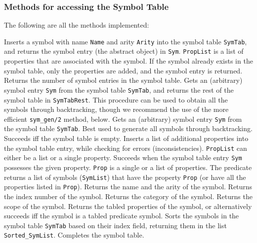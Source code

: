 \subsubsection{Methods for accessing the Symbol Table}
The following are all the methods implemented:

\begin{description}
	Inserts a symbol with name {\tt Name} and arity {\tt Arity} into 
	the symbol table {\tt SymTab}, and returns the symbol entry (the
	abstract object) in {\tt Sym}.  {\tt PropList} is a list of
	properties that are associated with the symbol.  If the symbol
	already exists in the symbol table, only the properties are
	added, and the symbol entry is returned.
	Returns the number of symbol entries in the symbol table.
	Gets an (arbitrary) symbol entry {\tt Sym} from the symbol table 
	{\tt SymTab}, and returns the rest of the symbol table in 
	{\tt SymTabRest}.  This procedure can be used to obtain
	all the symbols through backtracking, though we recommend the
	use of the more efficient {\tt sym\_gen/2} method, below.
	Gets an (arbitrary) symbol entry {\tt Sym} from the symbol table 
	{\tt SymTab}.  Best used to generate all symbols through
	backtracking.
	Succeeds iff the symbol table is empty.
	Inserts a list of additional properties into the symbol table
	entry, while checking for errors (inconsistencies).
	{\tt PropList} can either be a list or a single property.
	Succeeds when the symbol table entry {\tt Sym} possesses the
	given property.
	{\tt Prop} is a single or a list of properties.
	The predicate returns a list of symbols ({\tt SymList}) that
	have the property {\tt Prop} (or have all the properties listed
	in {\tt Prop}).
	Returns the name and the arity of the symbol.
	Returns the index number of the symbol.
	Returns the category of the symbol.
	Returns the scope of the symbol.
	Returns the tabled properties of the symbol, or alternatively
	succeeds iff the symbol is a tabled predicate symbol.
	Sorts the symbols in the symbol table {\tt SymTab} based on their
	index field, returning them in the list {\tt Sorted\_SymList}.
	Completes the symbol table.
\end{description}



